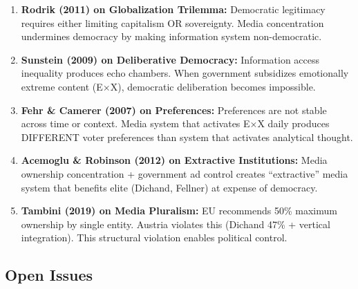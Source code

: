 \begin{enumerate}
\item \textbf{Rodrik (2011) on Globalization Trilemma:} Democratic legitimacy requires
  either limiting capitalism OR sovereignty. Media concentration undermines democracy
  by making information system non-democratic.

\item \textbf{Sunstein (2009) on Deliberative Democracy:} Information access
  inequality produces echo chambers. When government subsidizes emotionally extreme
  content (E×X), democratic deliberation becomes impossible.

\item \textbf{Fehr \& Camerer (2007) on Preferences:} Preferences are not stable
  across time or context. Media system that activates E×X daily produces DIFFERENT
  voter preferences than system that activates analytical thought.

\item \textbf{Acemoglu \& Robinson (2012) on Extractive Institutions:} Media ownership
  concentration + government ad control creates ``extractive'' media system that
  benefits elite (Dichand, Fellner) at expense of democracy.

\item \textbf{Tambini (2019) on Media Pluralism:} EU recommends 50\% maximum ownership
  by single entity. Austria violates this (Dichand 47\% + vertical integration).
  This structural violation enables political control.
\end{enumerate}


\subsection{Open Issues}

